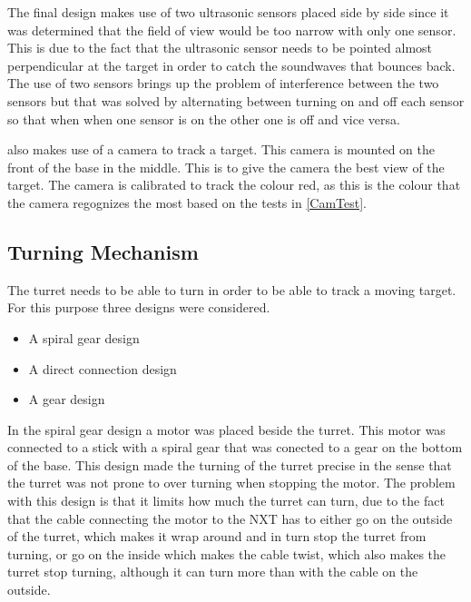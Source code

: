 The final design makes use of two ultrasonic sensors placed side by side since
it was determined that the field of view would be too narrow with only one
sensor. This is due to the fact that the ultrasonic sensor needs to be pointed
almost perpendicular at the target in order to catch the soundwaves that bounces
back. The use of two sensors brings up the problem of interference between the
two sensors but that was solved by alternating between turning on and off each
sensor so that when when one sensor is on the other one is off and vice
versa.\nl

\name also makes use of a camera to track a target. This camera is mounted on
the front of the base in the middle. This is to give the camera the best
view of the target. The camera is calibrated to track the colour red, as this
is the colour that the camera regognizes the most based on the tests in \autoref{CamTest}.

\subsection{Turning Mechanism}
The turret needs to be able to turn in order to be able to track a moving
target. For this purpose three designs were considered. 

\begin{itemize}
  \item A spiral gear design
  \item A direct connection design
  \item A gear design
\end{itemize}

In the spiral gear design a motor was placed beside the turret. This motor was
connected to a stick with a spiral gear that was conected to a gear on the bottom of the base. This design
made the turning of the turret precise in the sense that the turret was not
prone to over turning when stopping the motor. The problem with this design is
that it limits how much the turret can turn, due to the fact that the cable
connecting the motor to the NXT has to either go on the outside of the turret,
which makes it wrap around and in turn stop the turret from turning, or go on
the inside which makes the cable twist, which also makes the turret stop
turning, although it can turn more than with the cable on the outside.\nl

